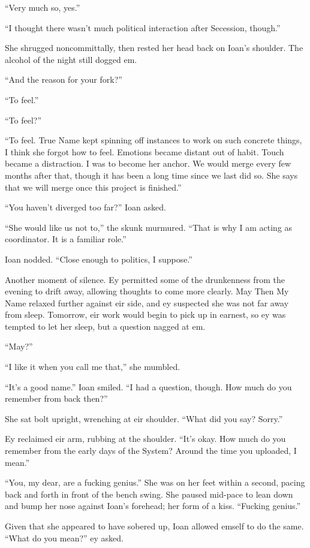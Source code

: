 ``Very much so, yes.''

``I thought there wasn't much political interaction after Secession, though.''

She shrugged noncommittally, then rested her head back on Ioan's shoulder. The alcohol of the night still dogged em.

``And the reason for your fork?''

``To feel.''

``To feel?''

``To feel. True Name kept spinning off instances to work on such concrete things, I think she forgot how to feel. Emotions became distant out of habit. Touch became a distraction. I was to become her anchor. We would merge every few months after that, though it has been a long time since we last did so. She says that we will merge once this project is finished.''

``You haven't diverged too far?'' Ioan asked.

``She would like us not to,'' the skunk murmured. ``That is why I am acting as coordinator. It is a familiar role.''

Ioan nodded. ``Close enough to politics, I suppose.''

Another moment of silence. Ey permitted some of the drunkenness from the evening to drift away, allowing thoughts to come more clearly. May Then My Name relaxed further against eir side, and ey suspected she was not far away from sleep. Tomorrow, eir work would begin to pick up in earnest, so ey was tempted to let her sleep, but a question nagged at em.

``May?''

``I like it when you call me that,'' she mumbled.

``It's a good name.'' Ioan smiled. ``I had a question, though. How much do you remember from back then?''

She sat bolt upright, wrenching at eir shoulder. ``What did you say? Sorry.''

Ey reclaimed eir arm, rubbing at the shoulder. ``It's okay. How much do you remember from the early days of the System? Around the time you uploaded, I mean.''

``You, my dear, are a fucking genius.'' She was on her feet within a second, pacing back and forth in front of the bench swing. She paused mid-pace to lean down and bump her nose against Ioan's forehead; her form of a kiss. ``Fucking genius.''

Given that she appeared to have sobered up, Ioan allowed emself to do the same. ``What do you mean?'' ey asked.

